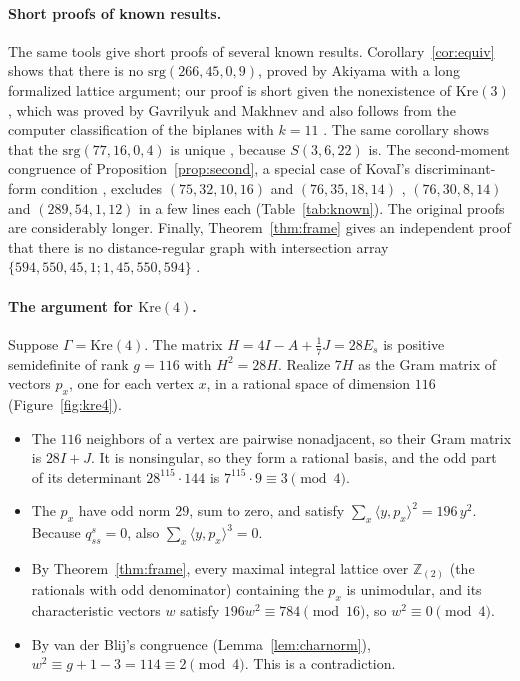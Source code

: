 \documentclass[11pt]{article}
\theoremstyle{definition}
\theoremstyle{remark}
\newcommand{\Z}{\mathbb Z}
\newcommand{\Zt}{\Z_{(2)}}
\newcommand{\ip}[2]{\langle #1,#2\rangle}
\newcommand{\Kre}{\mathrm{Kre}}
\begin{document}
\paragraph{Short proofs of known results.}
The same tools give short proofs of several known results.
Corollary~\ref{cor:equiv} shows that there is no $\mathrm{srg}(266,45,0,9)$,
proved by Akiyama \cite{Akiyama} with a long formalized lattice argument;
our proof is short given the nonexistence of $\Kre(3)$, which was proved by
Gavrilyuk and Makhnev \cite{GM} and also follows from the computer
classification of the biplanes with $k=11$ \cite{KO}. The same corollary shows that the
$\mathrm{srg}(77,16,0,4)$ is unique \cite{Br77}, because $S(3,6,22)$ is. The
second-moment congruence of Proposition~\ref{prop:second}, a special case of
Kova\v l's discriminant-form condition \cite{Koval}, excludes
$(75,32,10,16)$ and $(76,35,18,14)$ \cite{AM}, $(76,30,8,14)$ \cite{BPR} and
$(289,54,1,12)$ \cite{BR} in a few lines each (Table~\ref{tab:known}). The
original proofs are considerably longer. Finally, Theorem~\ref{thm:frame} gives an
independent proof that there is no distance-regular graph with intersection
array $\{594,550,45,1;1,45,550,594\}$ \cite{CW}.

\paragraph{The argument for $\Kre(4)$.}
Suppose $\Gamma=\Kre(4)$. The matrix $H=4I-A+\tfrac17J=28E_s$ is positive
semidefinite of rank $g=116$ with $H^2=28H$. Realize $7H$ as the Gram matrix
of vectors $p_x$, one for each vertex $x$, in a rational space of dimension
$116$ (Figure~\ref{fig:kre4}).
\begin{itemize}
\item The $116$ neighbors of a vertex are pairwise nonadjacent, so their Gram
matrix is $28I+J$. It is nonsingular, so they form a rational basis, and the
odd part of its determinant $28^{115}\cdot144$ is $7^{115}\cdot9\equiv3\pmod 4$.
\item The $p_x$ have odd norm $29$, sum to zero, and satisfy
$\sum_x\ip y{p_x}^2=196\,y^2$. Because $q^s_{ss}=0$, also
$\sum_x\ip y{p_x}^3=0$.
\item By Theorem~\ref{thm:frame}, every maximal integral lattice over $\Zt$
(the rationals with odd denominator) containing the $p_x$ is unimodular, and
its characteristic vectors $w$
satisfy $196w^2\equiv784\pmod{16}$, so $w^2\equiv0\pmod 4$.
\item By van der Blij's congruence (Lemma~\ref{lem:charnorm}),
$w^2\equiv g+1-3=114\equiv2\pmod 4$. This is a contradiction.
\end{itemize}
\end{document}
